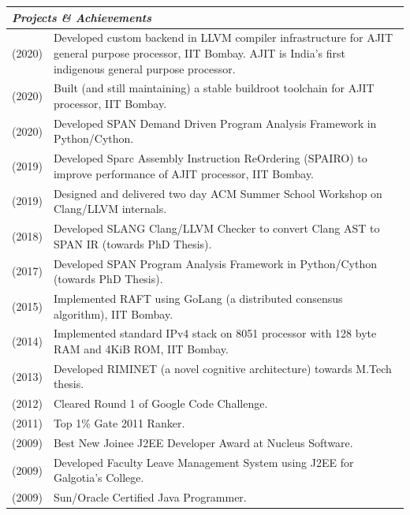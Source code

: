 \documentclass[a4paper,12pt]{article}
\newcommand{\Heading}[1]{\textbf{\itshape\normalsize #1}}
\begin{document}
\begin{flushleft}
\vspace{1em}
\begin{tabular}{ m{} m{}}
\multicolumn{2}{l}{\Heading{Projects \& Achievements}} \\
    \hline
    \hline
\rule[13pt]{0ex}{0ex}(2020) & Developed custom backend in LLVM compiler infrastructure
for AJIT general purpose processor, IIT Bombay. AJIT is India's first indigenous general purpose processor. \\
\rule[13pt]{0ex}{0ex}(2020) & Built (and still maintaining) a stable buildroot toolchain
for AJIT processor, IIT Bombay. \\
\rule[13pt]{0ex}{0ex}(2020) & Developed SPAN Demand Driven Program Analysis Framework in Python/Cython. \\
\rule[13pt]{0ex}{0ex}(2019) & Developed Sparc Assembly Instruction ReOrdering (SPAIRO)
to improve performance of AJIT processor, IIT Bombay. \\
\rule[13pt]{0ex}{0ex}(2019) & Designed and delivered two day ACM Summer School Workshop on Clang/LLVM internals.\\
\rule[13pt]{0ex}{0ex}(2018) & Developed SLANG Clang/LLVM Checker to convert Clang AST to SPAN IR (towards PhD Thesis). \\
\rule[13pt]{0ex}{0ex}(2017) & Developed SPAN Program Analysis Framework in Python/Cython (towards PhD Thesis). \\
\rule[13pt]{0ex}{0ex}(2015) & Implemented RAFT using GoLang (a distributed consensus algorithm), IIT Bombay. \\
\rule[13pt]{0ex}{0ex}(2014) & Implemented standard IPv4 stack on 8051 processor with 128 byte RAM and 4KiB ROM, IIT Bombay. \\
\rule[13pt]{0ex}{0ex}(2013) & Developed RIMINET (a novel cognitive architecture) towards M.Tech thesis. \\
\rule[13pt]{0ex}{0ex}(2012) & Cleared Round 1 of Google Code Challenge. \\
\rule[13pt]{0ex}{0ex}(2011) & Top 1\% Gate 2011 Ranker. \\
\rule[13pt]{0ex}{0ex}(2009) & Best New Joinee J2EE Developer Award at Nucleus Software. \\
\rule[13pt]{0ex}{0ex}(2009) & Developed Faculty Leave Management System using J2EE for Galgotia's College.\\
\rule[13pt]{0ex}{0ex}(2009) & Sun/Oracle Certified Java Programmer. \\
\end{tabular}


\end{flushleft}
\end{document}

